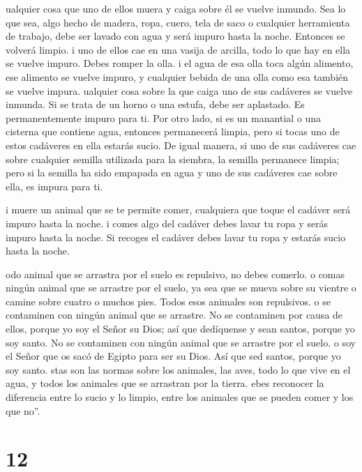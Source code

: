  ualquier cosa que uno de ellos muera y caiga sobre él se
vuelve inmundo. Sea lo que sea, algo hecho de madera, ropa, cuero, tela
de saco o cualquier herramienta de trabajo, debe ser lavado con agua y
será impuro hasta la noche. Entonces se volverá limpio.  i
uno de ellos cae en una vasija de arcilla, todo lo que hay en ella se
vuelve impuro. Debes romper la olla.  i el agua de esa olla
toca algún alimento, ese alimento se vuelve impuro, y cualquier bebida
de una olla como esa también se vuelve impura.  ualquier
cosa sobre la que caiga uno de sus cadáveres se vuelve inmunda. Si se
trata de un horno o una estufa, debe ser aplastado. Es permanentemente
impuro para ti.  Por otro lado, si es un manantial o una
cisterna que contiene agua, entonces permanecerá limpia, pero si tocas
uno de estos cadáveres en ella estarás sucio.  De igual
manera, si uno de sus cadáveres cae sobre cualquier semilla utilizada
para la siembra, la semilla permanece limpia;  pero si la
semilla ha sido empapada en agua y uno de sus cadáveres cae sobre ella,
es impura para ti.

 i muere un animal que se te permite comer, cualquiera que
toque el cadáver será impuro hasta la noche.  i comes algo
del cadáver debes lavar tu ropa y serás impuro hasta la noche. Si
recoges el cadáver debes lavar tu ropa y estarás sucio hasta la noche.

 odo animal que se arrastra por el suelo es repulsivo, no
debes comerlo.  o comas ningún animal que se arrastre por
el suelo, ya sea que se mueva sobre su vientre o camine sobre cuatro o
muchos pies. Todos esos animales son repulsivos.  o se
contaminen con ningún animal que se arrastre. No se contaminen por causa
de ellos,  porque yo soy el Señor su Dios; así que
dedíquense y sean santos, porque yo soy santo. No se contaminen con
ningún animal que se arrastre por el suelo.  o soy el Señor
que os sacó de Egipto para ser su Dios. Así que sed santos, porque yo
soy santo.  stas son las normas sobre los animales, las
aves, todo lo que vive en el agua, y todos los animales que se arrastran
por la tierra.  ebes reconocer la diferencia entre lo sucio
y lo limpio, entre los animales que se pueden comer y los que no''.

\hypertarget{section-11}{%
\section{12}\label{section-11}}

